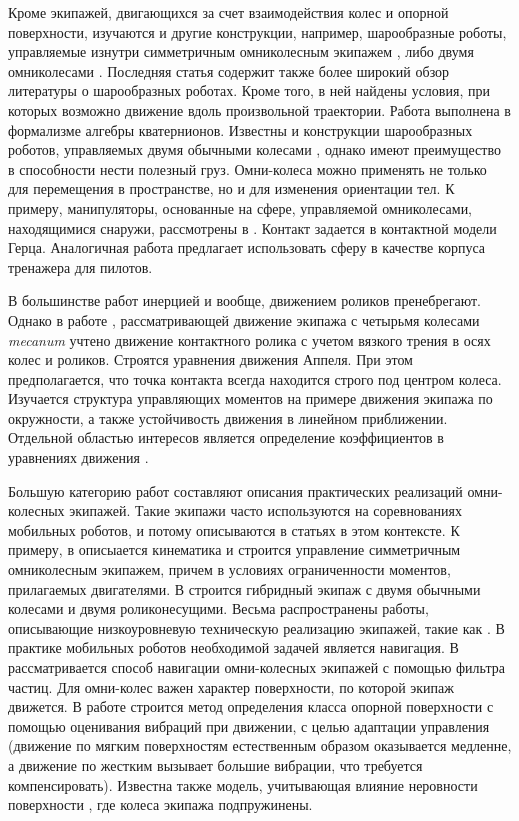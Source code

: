 Кроме экипажей, двигающихся за счет взаимодействия колес и опорной поверхности, изучаются и другие конструкции, например, шарообразные роботы, управляемые изнутри симметричным омниколесным экипажем \cite{Karavaev2015},
либо двумя омниколесами \cite{Ivanov2015a}. Последняя статья содержит также более широкий обзор литературы о шарообразных роботах. Кроме того, в ней найдены условия, при которых возможно движение вдоль произвольной траектории. Работа выполнена в формализме алгебры кватернионов. Известны и конструкции шарообразных роботов, управляемых двумя обычными колесами \cite{Zhan2011}, однако \cite{Ivanov2015a} имеют преимущество в способности нести полезный груз. Омни-колеса можно применять не только для перемещения в пространстве, но и для изменения ориентации тел. К примеру, манипуляторы, основанные на сфере, управляемой омниколесами, находящимися снаружи, рассмотрены в \cite{Weiss2015}. Контакт задается в контактной модели Герца. Аналогичная работа \cite{Plumpton2014} предлагает использовать сферу в качестве корпуса тренажера для пилотов.

В большинстве работ инерцией и вообще, движением роликов пренебрегают. Однако в работе \cite{Adamov2018}, рассматривающей движение экипажа с четырьмя колесами \textit{mecanum} учтено движение контактного ролика с учетом вязкого трения в осях колес и роликов. Строятся уравнения движения Аппеля. При этом предполагается, что точка контакта всегда находится строго под центром колеса. Изучается структура управляющих моментов на примере движения экипажа по окружности, а также устойчивость движения в линейном приближении. Отдельной областью интересов является определение коэффициентов в уравнениях движения \cite{Adamov2018a}.

Большую категорию работ составляют описания практических реализаций омни-колесных экипажей. Такие экипажи часто используются на соревнованиях мобильных роботов, и потому описываются в статьях в этом контексте. К примеру, в \cite{Indiveri2007} описыается кинематика и строится управление симметричным омниколесным экипажем, причем в условиях ограниченности моментов, прилагаемых двигателями. В \cite{Wada2007} строится гибридный экипаж с двумя обычными колесами и двумя роликонесущими. Весьма распространены работы, описывающие  низкоуровневую техническую реализацию экипажей, такие как \cite{Mohamed2017,Krishnaraj2017,SalamAl-Ammri2010}. В практике мобильных роботов необходимой задачей является навигация. В \cite{Eng2010} рассматривается способ навигации омни-колесных экипажей с помощью фильтра частиц. Для омни-колес важен характер поверхности, по которой экипаж движется. В работе \cite{Vicente2015} строится метод определения класса опорной поверхности с помощью оценивания вибраций при движении, с целью адаптации управления (движение по мягким поверхностям естественным образом оказывается медленне, а движение по жестким вызывает б\textit{о}льшие вибрации, что требуется компенсировать). Известна также модель, учитывающая влияние неровности поверхности \cite{NguenMAI2012}, где колеса экипажа подпружинены.

